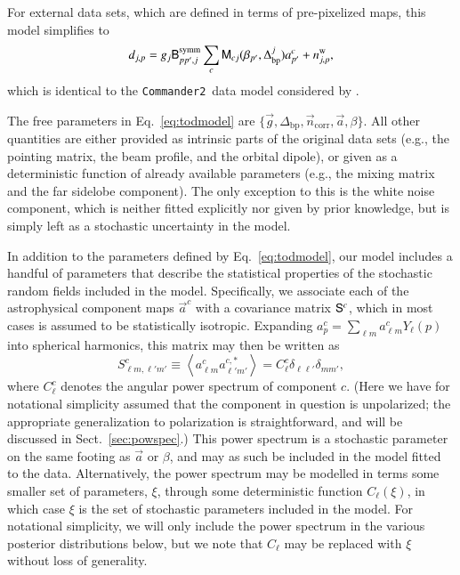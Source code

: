 \documentclass[onecolumn]{aa}
\def\commandertwo{\texttt{Commander2}}
\newcommand{\n}[0]{\vec{n}}
\renewcommand{\a}[0]{\vec{a}}
\newcommand{\B}[0]{\tens{B}}
\newcommand{\g}[0]{\vec{g}}
\newcommand{\M}[0]{\tens{M}}
\renewcommand{\S}[0]{\tens{S}}
\newcommand{\Dbp}[0]{\Delta_{\mathrm{bp}}}
\begin{document}
For external data sets, which are defined in terms of pre-pixelized
maps, this model simplifies to
\begin{equation}
  d_{j,p} = g_{j}\B^{\mathrm{symm}}_{pp',j}\sum_{c} \M_{cj}(\beta_{p'},
  \Dbp^{j})a^c_{p'} + n^{\mathrm{w}}_{j,p},
  \label{eq:pixmodel}
\end{equation}
which is identical to the \commandertwo\ data model considered by
\citet{seljebotn:2019}.

The free parameters in Eq.~\eqref{eq:todmodel} are
$\{\g,\Dbp,\n_{\mathrm{corr}}, \a, \beta\}$. All other
quantities are either provided as intrinsic parts of the original data
sets (e.g., the pointing matrix, the beam profile, and the orbital
dipole), or given as a deterministic function of already available
parameters (e.g., the mixing matrix and the far sidelobe
component). The only exception to this is the white noise component,
which is neither fitted explicitly nor given by prior knowledge, but
is simply left as a stochastic uncertainty in the model.

In addition to the parameters defined by Eq.~\eqref{eq:todmodel}, our
model includes a handful of parameters that describe the statistical
properties of the stochastic random fields included in the
model. Specifically, we associate each of the astrophysical component
maps $\a^c$ with a covariance matrix $\S^c$, which in most cases is
assumed to be statistically isotropic. Expanding $a^c_p = \sum_{\ell
  m} a^{c}_{\ell m} Y_{\ell}(p)$ into spherical harmonics, this matrix may
then be written as
\begin{equation}
S^{c}_{\ell m, \ell' m'} \equiv \left< a^{c}_{\ell m} a^{c,*}_{\ell' m'}\right> = C^{c}_{\ell} \delta_{\ell\ell'} \delta_{mm'},
\end{equation}
where $C^{c}_{\ell}$ denotes the angular power spectrum of component
$c$. (Here we have for notational simplicity assumed that the
component in question is unpolarized; the appropriate generalization
to polarization is straightforward, and will be discussed in Sect.~\ref{sec:powspec}.)
This power spectrum is a stochastic parameter on the same footing as
$\a$ or $\beta$, and may as such be included in the model fitted to
the data. Alternatively, the power spectrum may be modelled in terms
some smaller set of parameters, $\xi$, through some deterministic
function $C_{\ell}(\xi)$, in which case $\xi$ is the set of
stochastic parameters included in the model. For notational
simplicity, we will only include the power spectrum in the various
posterior distributions below, but we note that $C_\ell$ may be
replaced with $\xi$ without loss of generality.
\end{document}
